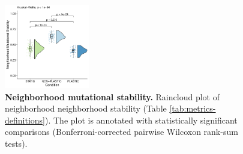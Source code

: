 \begin{figure}[ht!]
    \centering
    \includegraphics[width=0.33\textwidth]{media/architecture/neighborhood_mutational_stability.pdf}
    \caption{\small
        \textbf{Neighborhood mutational stability.}
        Raincloud plot of neighborhood neighborhood stability (Table \ref{tab:metrics-definitions}).
        The plot is annotated with statistically significant comparisons (Bonferroni-corrected pairwise Wilcoxon rank-sum tests). 
    }
    \label{fig:neighborhood-mutational-stability}
\end{figure}